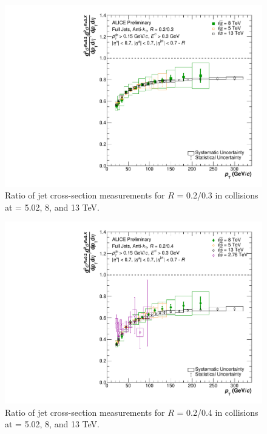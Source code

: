 \begin{figure}[h!]
    \centering
    \includegraphics[width=15cm]{figures/EnergyComparisons/RatioComparison_R03.pdf}
    \caption{Ratio of jet cross-section measurements for $R$ = 0.2/0.3 in \pp collisions at \s = 5.02, 8, and 13 TeV.}
    \label{fig:appRatioCompareR03}
\end{figure}

\begin{figure}[h!]
    \centering
    \includegraphics[width=15cm]{figures/EnergyComparisons/RatioComparison_R04.pdf}
    \caption{Ratio of jet cross-section measurements for $R$ = 0.2/0.4 in \pp collisions at \s = 5.02, 8, and 13 TeV.}
    \label{fig:appRatioCompareR04}
\end{figure}

